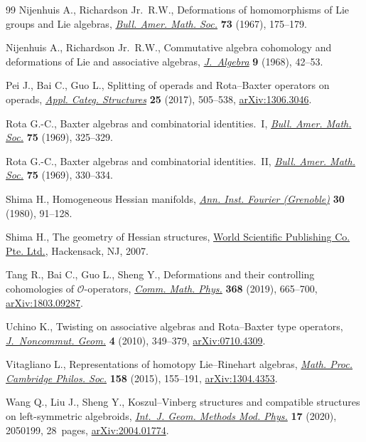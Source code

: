 \begin{thebibliography}{99}
Nijenhuis A., Richardson Jr.~R.W., Deformations of homomorphisms of {L}ie
 groups and {L}ie algebras, \href{https://doi.org/10.1090/S0002-9904-1967-11703-8}{\textit{Bull. Amer. Math. Soc.}} \textbf{73}
 (1967), 175--179.

Nijenhuis A., Richardson Jr.~R.W., Commutative algebra cohomology and
 deformations of {L}ie and associative algebras, \href{https://doi.org/10.1016/0021-8693(68)90004-5}{\textit{J.~Algebra}}
 \textbf{9} (1968), 42--53.

Pei J., Bai C., Guo L., Splitting of operads and {R}ota--{B}axter operators on
 operads, \href{https://doi.org/10.1007/s10485-016-9431-5}{\textit{Appl. Categ. Structures}} \textbf{25} (2017), 505--538,
 \href{https://arxiv.org/abs/1306.3046}{arXiv:1306.3046}.

Rota G.-C., Baxter algebras and combinatorial identities.~{I}, \href{https://doi.org/10.1090/S0002-9904-1969-12156-7}{\textit{Bull.
 Amer. Math. Soc.}} \textbf{75} (1969), 325--329.

Rota G.-C., Baxter algebras and combinatorial identities.~{II}, \href{https://doi.org/10.1090/S0002-9904-1969-12158-0}{\textit{Bull.
 Amer. Math. Soc.}} \textbf{75} (1969), 330--334.

Shima H., Homogeneous {H}essian manifolds, \href{https://doi.org/10.5802/aif.794}{\textit{Ann. Inst. Fourier
 (Grenoble)}} \textbf{30} (1980), 91--128.

Shima H., The geometry of {H}essian structures, \href{https://doi.org/10.1142/9789812707536}{World Scientific Publishing Co.
 Pte. Ltd.}, Hackensack, NJ, 2007.

Tang R., Bai C., Guo L., Sheng Y., Deformations and their controlling
 cohomologies of {$\mathcal{O}$}-operators, \href{https://doi.org/10.1007/s00220-019-03286-x}{\textit{Comm. Math. Phys.}}
 \textbf{368} (2019), 665--700, \href{https://arxiv.org/abs/1803.09287}{arXiv:1803.09287}.

Uchino K., Twisting on associative algebras and {R}ota--{B}axter type
 operators, \href{https://doi.org/10.4171/jncg/59}{\textit{J.~Noncommut. Geom.}} \textbf{4} (2010), 349--379,
 \href{https://arxiv.org/abs/0710.4309}{arXiv:0710.4309}.

Vitagliano L., Representations of homotopy {L}ie--{R}inehart algebras,
 \href{https://doi.org/10.1017/S0305004114000541}{\textit{Math. Proc. Cambridge Philos. Soc.}} \textbf{158} (2015), 155--191,
 \href{https://arxiv.org/abs/1304.4353}{arXiv:1304.4353}.

Wang Q., Liu J., Sheng Y., Koszul--{V}inberg structures and compatible
 structures on left-symmetric algebroids, \href{https://doi.org/10.1142/S0219887820501996}{\textit{Int.~J. Geom. Methods Mod.
 Phys.}} \textbf{17} (2020), 2050199, 28~pages, \href{https://arxiv.org/abs/2004.01774}{arXiv:2004.01774}.

\end{thebibliography}
